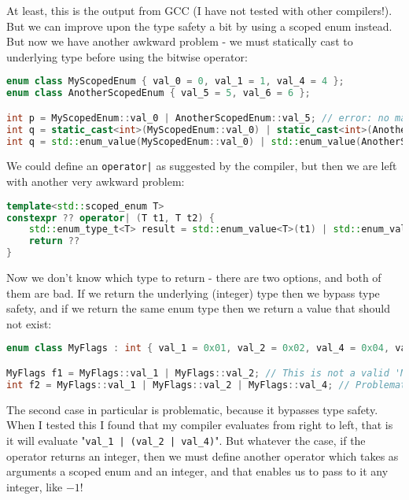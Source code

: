 \documentclass[
  format=manuscript,
  screen=true,
  review=false,
  nonacm=true,
  timestamp=true,
  balance=false]{acmart}
\newcommand{\beforecodespace}{\vspace{4mm}}
\begin{document}
\noindent
At least, this is the output from GCC (I have not tested with other compilers!).
But we can improve upon the type safety a bit by using a scoped enum instead.
But now we have another awkward problem - we must statically cast to underlying
type before using the bitwise operator:

\beforecodespace\begin{lstlisting}[language=Cpp]
enum class MyScopedEnum { val_0 = 0, val_1 = 1, val_4 = 4 };
enum class AnotherScopedEnum { val_5 = 5, val_6 = 6 };

int p = MyScopedEnum::val_0 | AnotherScopedEnum::val_5; // error: no match for 'operator|'
int q = static_cast<int>(MyScopedEnum::val_0) | static_cast<int>(AnotherScopedEnum::val_5); // valid
int q = std::enum_value(MyScopedEnum::val_0) | std::enum_value(AnotherScopedEnum::val_5); // same
\end{lstlisting}

We could define an \texttt{operator|} as suggested by the compiler, but then we are
left with another very awkward problem:

\beforecodespace\begin{lstlisting}[language=Cpp]
template<std::scoped_enum T>
constexpr ?? operator| (T t1, T t2) {
    std::enum_type_t<T> result = std::enum_value<T>(t1) | std::enum_value<T>(t2);
    return ??
}
\end{lstlisting}

\noindent
Now we don't know which type to return - there are two options, and both of them are
bad. If we return the underlying (integer) type then we bypass type safety, and if
we return the same enum type then we return a value that should not exist:

\beforecodespace\begin{lstlisting}[language=Cpp]
enum class MyFlags : int { val_1 = 0x01, val_2 = 0x02, val_4 = 0x04, val_8 = 0x08 };

MyFlags f1 = MyFlags::val_1 | MyFlags::val_2; // This is not a valid 'MyFlags' !
int f2 = MyFlags::val_1 | MyFlags::val_2 | MyFlags::val_4; // Problematic!
\end{lstlisting}

The second case in particular is problematic, because it bypasses type safety.
When I tested this I found that my compiler evaluates from right to left, that is
it will evaluate "\texttt{val\_1 | (val\_2 | val\_4)}". But whatever the case, if
the operator returns an integer, then we must define another operator which takes
as arguments a scoped enum and an integer, and that enables us to pass to it any
integer, like $-1$!
\end{document}
